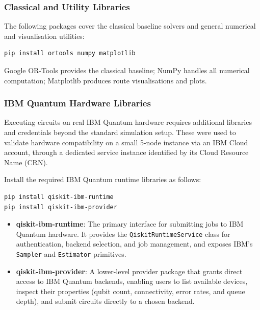 \documentclass[a4paper]{report}
\begin{document}
{\begin{itemize}
\begin{itemize}
\subsubsection{Classical and Utility Libraries}

The following packages cover the classical baseline solvers and general
numerical and visualisation utilities:

\begin{verbatim}
pip install ortools numpy matplotlib
\end{verbatim}

Google OR-Tools provides the classical baseline; NumPy handles all numerical
computation; Matplotlib produces route visualisations and plots.

\subsubsection{IBM Quantum Hardware Libraries}

Executing circuits on real IBM Quantum hardware requires additional libraries
and credentials beyond the standard simulation setup. These were used to
validate hardware compatibility on a small 5-node instance via an IBM Cloud
account, through a dedicated service instance
identified by its Cloud Resource Name (CRN).

Install the required IBM Quantum runtime libraries as follows:

\begin{verbatim}
pip install qiskit-ibm-runtime
pip install qiskit-ibm-provider
\end{verbatim}

\begin{itemize}
    \item \textbf{qiskit-ibm-runtime}: The primary interface for submitting
          jobs to IBM Quantum hardware. It provides the
          \texttt{QiskitRuntimeService} class for authentication, backend
          selection, and job management, and exposes IBM's \texttt{Sampler}
          and \texttt{Estimator} primitives.

    \item \textbf{qiskit-ibm-provider}: A lower-level provider package that
          grants direct access to IBM Quantum backends, enabling users to list
          available devices, inspect their properties (qubit count,
          connectivity, error rates, and queue depth), and submit circuits
          directly to a chosen backend.
\end{itemize}


\end{itemize}
\end{itemize}}
\end{document}
